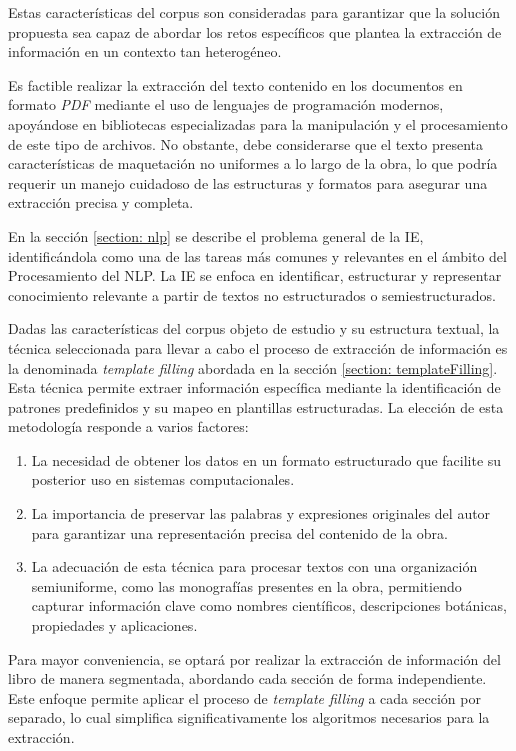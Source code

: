 Estas características del corpus son consideradas para garantizar que la solución propuesta sea capaz de 
abordar los retos específicos que plantea la extracción de información en un contexto tan heterogéneo.

Es factible realizar la extracción del texto contenido en los documentos en formato \textit{PDF} mediante el uso 
de lenguajes de programación modernos, apoyándose en bibliotecas especializadas para la manipulación y 
el procesamiento de este tipo de archivos. No obstante, debe considerarse que el texto presenta 
características de maquetación no uniformes a lo largo de la obra, lo que podría requerir un manejo 
cuidadoso de las estructuras y formatos para asegurar una extracción precisa y completa.

En la sección \ref{section: nlp} se describe el problema general de la IE, identificándola como una 
de las tareas más comunes y relevantes en el ámbito del Procesamiento del NLP. La IE
se enfoca en identificar, estructurar y representar conocimiento relevante a partir de 
textos no estructurados o semiestructurados.

Dadas las características del corpus objeto de estudio y su estructura textual, la técnica seleccionada 
para llevar a cabo el proceso de extracción de información es la denominada \textit{template filling} abordada en la sección \ref{section: templateFilling}. 
Esta técnica permite extraer información específica mediante la identificación de patrones 
predefinidos y su mapeo en plantillas estructuradas. La elección de esta metodología 
responde a varios factores:
\begin{enumerate}
    \item La necesidad de obtener los datos en un formato estructurado que facilite su posterior uso
    en sistemas computacionales.
    \item La importancia de preservar las palabras y expresiones originales del autor 
    para garantizar una representación precisa del contenido de la obra.
    \item La adecuación de esta técnica para procesar textos con una organización semiuniforme, 
    como las monografías presentes en la obra, permitiendo capturar información clave como 
    nombres científicos, descripciones botánicas, propiedades y aplicaciones.
\end{enumerate}

Para mayor conveniencia, se optará por realizar la extracción de información del libro de manera segmentada, 
abordando cada sección de forma independiente. Este enfoque permite aplicar el proceso de \textit{template filling} 
a cada sección por separado, lo cual simplifica significativamente los algoritmos necesarios para la extracción.



